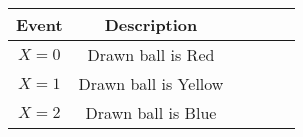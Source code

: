 \normalsize \begin{tabular}{|c|c|c|c|c|c|}

\hline
\textbf{Event} & \textbf{Description} \\
\hline
  $X=0$          &     Drawn ball is Red\\
\hline
  $X=1$          &     Drawn ball is Yellow\\
  \hline
  $X=2$          &     Drawn ball is Blue\\
\hline
\end{tabular}
